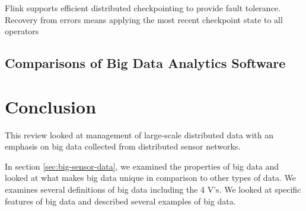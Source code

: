 \documentclass[]{article}
\begin{document}
Flink supports efficient distributed checkpointing to provide fault tolerance. Recovery from errors means applying the most recent checkpoint state to all operators






\subsection{Comparisons of Big Data Analytics Software}

\section{Conclusion}\label{sec:conclusion}
This review looked at management of large-scale distributed data with an emphasis on big data collected from distributed sensor networks. 

In section \ref{sec:big-sensor-data}, we examined the properties of big data and looked at what makes big data unique in comparison to other types of data. We examines several definitions of big data including the 4 V's. We looked at specific features of big data and described several examples of big data.
\end{document}
